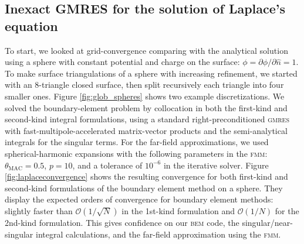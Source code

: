 \documentclass[final,leqno,]{siamltex1213}
\newcommand{\bem}{\textsc{bem}\xspace}
\newcommand{\fmm}{\textsc{fmm}\xspace}
\renewcommand{\O}[1]{\mathcal{O}(#1)}
\newcommand{\gmres}{\textsc{gmres}\xspace}
\newcommand{\partialdi}[2]{\partial #1 / \partial #2}
\newcommand{\nhat}{\hat{n}}
\begin{document}
\subsection{Inexact {\small GMRES} for the solution of Laplace's equation}
To start, we looked at grid-convergence comparing with the analytical solution using a sphere with constant potential and charge on the surface: $\phi = \partialdi{\phi}{\nhat} = 1$. To make surface triangulations of a sphere with increasing refinement, we started with an 8-triangle closed surface, then split recursively each triangle into four smaller ones. Figure \ref{fig:glob_spheres} shows two example discretizations. We solved the boundary-element problem by collocation in both the first-kind and second-kind integral formulations, using a standard right-preconditioned \gmres with fast-multipole-accelerated matrix-vector products and the semi-analytical integrals for the singular terms. For the far-field approximations, we used spherical-harmonic expansions with the following parameters in the \fmm: $\theta_{\text{MAC}} = 0.5$, $p = 10$, and a tolerance of $10^{-6}$ in the iterative solver. 
Figure \ref{fig:laplaceconvergence} shows the resulting convergence for both first-kind and second-kind formulations of the boundary element method on a sphere. They display the expected orders of convergence for boundary element methods: slightly faster than $\O{1/\sqrt{N}}$ in the 1st-kind formulation and $\O{1/N}$ for the 2nd-kind formulation. This gives confidence on our \bem code, the singular/near-singular integral calculations, and the far-field approximation using the \fmm.
\end{document}
